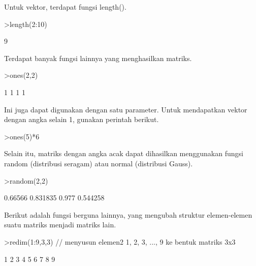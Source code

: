 \documentclass{article}
\newenvironment{eulernotebook}{\par}{\par}
\newenvironment{eulercomment}{\par\medskip}{\par\medskip}
\begin{document}
\begin{eulernotebook}
\begin{eulercomment}
\begin{eulercomment}
\begin{eulercomment}
\begin{eulercomment}
\begin{eulercomment}
\begin{eulercomment}
\begin{eulercomment}
Untuk vektor, terdapat fungsi length().
\end{eulercomment}
\begin{eulerprompt}
>length(2:10)
\end{eulerprompt}
\begin{euleroutput}
  9
\end{euleroutput}
\begin{eulercomment}
Terdapat banyak fungsi lainnya yang menghasilkan matriks.
\end{eulercomment}
\begin{eulerprompt}
>ones(2,2)
\end{eulerprompt}
\begin{euleroutput}
              1             1 
              1             1 
\end{euleroutput}
\begin{eulercomment}
Ini juga dapat digunakan dengan satu parameter. Untuk mendapatkan
vektor dengan angka selain 1, gunakan perintah berikut.
\end{eulercomment}
\begin{eulerprompt}
>ones(5)*6
\end{eulerprompt}
\begin{euleroutput}
  [6,  6,  6,  6,  6]
\end{euleroutput}
\begin{eulercomment}
Selain itu, matriks dengan angka acak dapat dihasilkan menggunakan
fungsi random (distribusi seragam) atau normal (distribusi Gauss).
\end{eulercomment}
\begin{eulerprompt}
>random(2,2)
\end{eulerprompt}
\begin{euleroutput}
        0.66566      0.831835 
          0.977      0.544258 
\end{euleroutput}
\begin{eulercomment}
Berikut adalah fungsi berguna lainnya, yang mengubah struktur
elemen-elemen suatu matriks menjadi matriks lain.
\end{eulercomment}
\begin{eulerprompt}
>redim(1:9,3,3) // menyusun elemen2 1, 2, 3, ..., 9 ke bentuk matriks 3x3
\end{eulerprompt}
\begin{euleroutput}
              1             2             3 
              4             5             6 
              7             8             9 
\end{euleroutput}

\end{eulercomment}
\end{eulercomment}
\end{eulercomment}
\end{eulercomment}
\end{eulercomment}
\end{eulercomment}
\end{eulernotebook}
\end{document}
